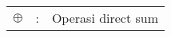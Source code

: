 \begin{flushleft}
\begin{tabular}{lrl}

$\oplus$ &:& Operasi direct sum

\end{tabular}
\end{flushleft}